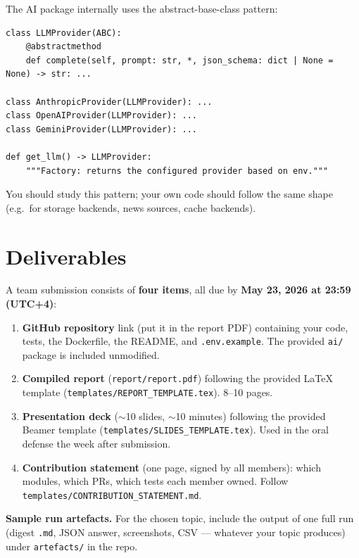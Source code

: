 \documentclass[11pt,a4paper]{article}
\newcommand{\duedate}{May 23, 2026 at 23:59 (UTC+4)}
\begin{document}
The AI package internally uses the abstract-base-class pattern:

\begin{lstlisting}[style=python]
class LLMProvider(ABC):
    @abstractmethod
    def complete(self, prompt: str, *, json_schema: dict | None = None) -> str: ...

class AnthropicProvider(LLMProvider): ...
class OpenAIProvider(LLMProvider): ...
class GeminiProvider(LLMProvider): ...

def get_llm() -> LLMProvider:
    """Factory: returns the configured provider based on env."""
\end{lstlisting}

You should study this pattern; your own code should follow the same shape (e.g.\ for storage backends, news sources, cache backends).

\section{Deliverables}\label{sec:deliverables}
A team submission consists of \textbf{four items}, all due by \textcolor{accent2}{\textbf{\duedate}}:

\begin{enumerate}[topsep=2pt,itemsep=2pt,leftmargin=2.2em]
  \item \textbf{GitHub repository} link (put it in the report PDF) containing your code, tests, the Dockerfile, the README, and \texttt{.env.example}. The provided \texttt{ai/} package is included unmodified.

  \item \textbf{Compiled report} (\texttt{report/report.pdf}) following the provided LaTeX template (\texttt{templates/REPORT\_TEMPLATE.tex}). 8--10 pages.

  \item \textbf{Presentation deck} ($\sim$10 slides, $\sim$10 minutes) following the provided Beamer template (\texttt{templates/SLIDES\_TEMPLATE.tex}). Used in the oral defense the week after submission.

  \item \textbf{Contribution statement} (one page, signed by all members): which modules, which PRs, which tests each member owned. Follow \texttt{templates/CONTRIBUTION\_STATEMENT.md}.
\end{enumerate}

\textbf{Sample run artefacts.} For the chosen topic, include the output of one full run (digest \texttt{.md}, JSON answer, screenshots, CSV --- whatever your topic produces) under \texttt{artefacts/} in the repo.
\end{document}
